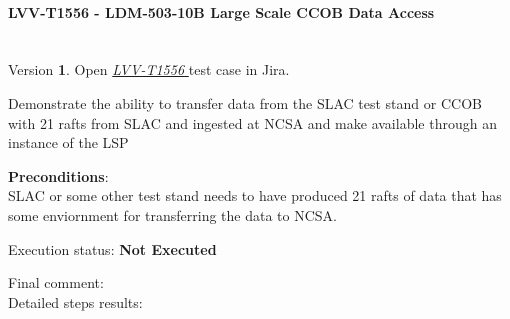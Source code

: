 \documentclass[DM,lsstdraft,STR,toc]{lsstdoc}
\begin{document}
\paragraph{ LVV-T1556 - LDM-503-10B Large Scale CCOB Data Access }\mbox{}\\

Version \textbf{1}.
Open  \href{https://jira.lsstcorp.org/secure/Tests.jspa#/testCase/LVV-T1556}{\textit{ LVV-T1556 } }
test case in Jira.

Demonstrate the ability to transfer data from the SLAC test stand or
CCOB with 21 rafts from SLAC and ingested at NCSA and make available
through an instance of the LSP

\textbf{ Preconditions}:\\
SLAC or some other test stand needs to have produced 21 rafts of data
that has some enviornment for transferring the data to NCSA.~ ~

Execution status: {\bf Not Executed }

Final comment:\\


Detailed steps results:
\end{document}

